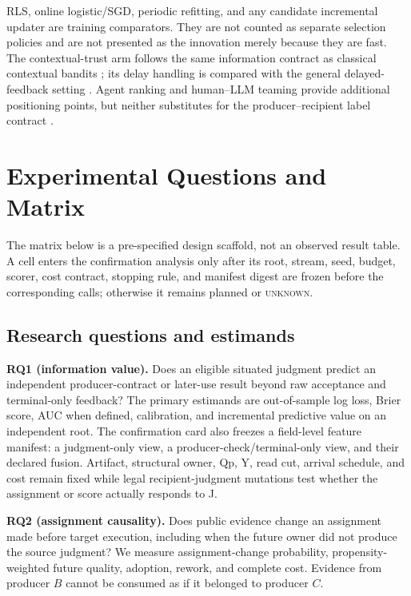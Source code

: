 \documentclass[sigconf,anonymous]{aamas}
\newcommand{\unknown}{\textsc{unknown}}
\begin{document}
RLS, online logistic/SGD, periodic refitting, and any candidate incremental updater are training comparators. They are not counted as separate selection policies and are not presented as the innovation merely because they are fast. The contextual-trust arm follows the same information contract as classical contextual bandits \cite{li2010contextual}; its delay handling is compared with the general delayed-feedback setting \cite{joulani2013delayed}. Agent ranking and human--LLM teaming provide additional positioning points, but neither substitutes for the producer--recipient label contract \cite{lanctot2025soft,yurrita2026guidelines}.

\section{Experimental Questions and Matrix}
\label{sec:experiments}

The matrix below is a pre-specified design scaffold, not an observed result table. A cell enters
the confirmation analysis only after its root, stream, seed, budget, scorer, cost contract,
stopping rule, and manifest digest are frozen before the corresponding calls; otherwise it
remains planned or \unknown{}.

\subsection{Research questions and estimands}
\textbf{RQ1 (information value).} Does an eligible situated judgment predict an independent producer-contract or later-use result beyond raw acceptance and terminal-only feedback? The primary estimands are out-of-sample log loss, Brier score, AUC when defined, calibration, and incremental predictive value on an independent root. The confirmation card also freezes a field-level feature manifest: a judgment-only view, a producer-check/terminal-only view, and their declared fusion. Artifact, structural owner, Qp, Y, read cut, arrival schedule, and cost remain fixed while legal recipient-judgment mutations test whether the assignment or score actually responds to J.

\textbf{RQ2 (assignment causality).} Does public evidence change an assignment made before target execution, including when the future owner did not produce the source judgment? We measure assignment-change probability, propensity-weighted future quality, adoption, rework, and complete cost. Evidence from producer $B$ cannot be consumed as if it belonged to producer $C$.
\end{document}
